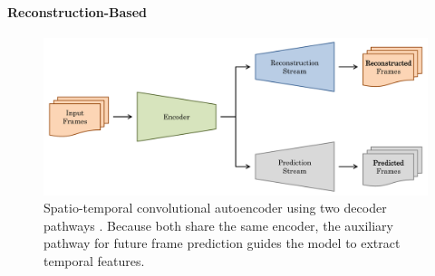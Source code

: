 \paragraph{Reconstruction-Based}

\begin{figure}
	\centering
	\includegraphics[width=1\textwidth]{graphics/gan/convAE/convAE.pdf}
  \caption[Spatio-temporal convolutional autoencoder using two decoder pathways.]{Spatio-temporal convolutional autoencoder using two decoder pathways \cite{zhao2017spatio}. Because both share the same encoder, the auxiliary pathway for future frame prediction guides the model to extract temporal features.}
  \label{fig:auto_enc}
\end{figure}


